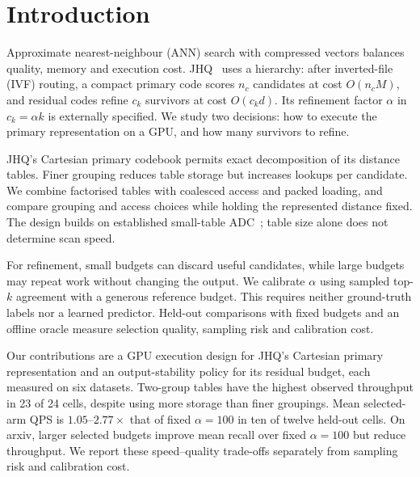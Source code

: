 \section{Introduction}
\label{sec:intro}
Approximate nearest-neighbour (ANN) search with compressed vectors balances
quality, memory and execution cost. JHQ~\cite{jhq} uses a hierarchy: after inverted-file (IVF)
routing, a compact primary code scores $n_c$ candidates at cost $O(n_cM)$,
and residual codes refine $c_k$ survivors at cost $O(c_kd)$. Its refinement
factor $\alpha$ in $c_k=\alpha k$ is externally specified. We study two
decisions: how to execute the primary representation on a GPU, and how many
survivors to refine.

JHQ's Cartesian primary codebook permits exact decomposition of its distance
tables. Finer grouping reduces table storage but increases lookups per
candidate. We combine factorised tables with coalesced access and packed
loading, and compare grouping and access choices while holding the represented
distance fixed. The design builds on established small-table
ADC~\cite{fastscan,quickeradc}; table size alone does not determine scan speed.

For refinement, small budgets can discard useful candidates, while large
budgets may repeat work without changing the output. We calibrate $\alpha$
using sampled top-$k$ agreement with a generous reference budget. This requires
neither ground-truth labels nor a learned predictor. Held-out comparisons with
fixed budgets and an offline oracle measure selection quality, sampling risk
and calibration cost.

Our contributions are a GPU execution design for JHQ's Cartesian primary
representation and an output-stability policy for its residual budget, each
measured on six datasets. Two-group tables have the highest observed
throughput in 23 of 24 cells, despite using more storage than finer groupings.
Mean selected-arm QPS is $1.05$--$2.77\times$ that of fixed $\alpha=100$ in
ten of twelve held-out cells. On arxiv, larger selected budgets improve mean recall over
fixed $\alpha=100$ but reduce throughput. We report these speed--quality
trade-offs separately from sampling risk and calibration cost.
